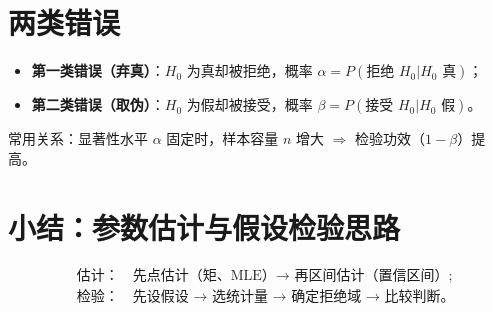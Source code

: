 \section{两类错误}

\begin{itemize}
      \item \textbf{第一类错误（弃真）}：$H_0$ 为真却被拒绝，概率 $\alpha=P(\text{拒绝 }H_0|H_0\text{ 真})$；
      \item \textbf{第二类错误（取伪）}：$H_0$ 为假却被接受，概率 $\beta=P(\text{接受 }H_0|H_0\text{ 假})$。
\end{itemize}

常用关系：显著性水平 $\alpha$ 固定时，样本容量 $n$ 增大 $\Rightarrow$ 检验功效（$1-\beta$）提高。

\section*{小结：参数估计与假设检验思路}

\[
      \boxed{
            \begin{aligned}
                   & \text{估计：}\quad \text{先点估计（矩、MLE）→ 再区间估计（置信区间）;}   \\[3pt]
                   & \text{检验：}\quad \text{先设假设 → 选统计量 → 确定拒绝域 → 比较判断。}
            \end{aligned}
      }
\]